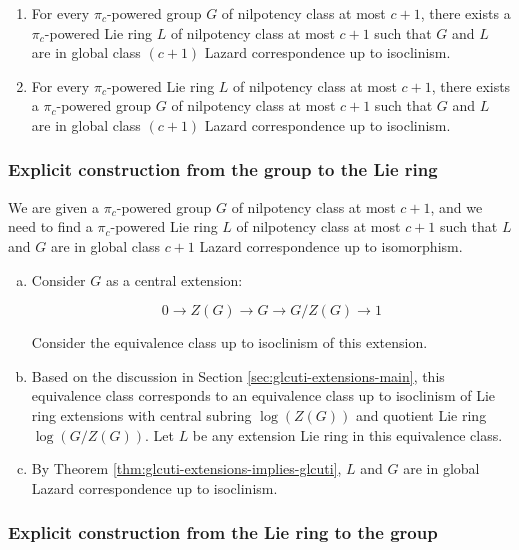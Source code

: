 \documentclass{ucetd}
\begin{document}
\begin{enumerate}
\item For every $\pi_c$-powered group $G$ of nilpotency class at most $c
  + 1$, there exists a $\pi_c$-powered Lie ring $L$ of nilpotency class at
  most $c + 1$ such that $G$ and $L$ are in global class $(c + 1)$ Lazard
  correspondence up to isoclinism.
\item For every $\pi_c$-powered Lie ring $L$ of nilpotency class at most
  $c + 1$, there exists a $\pi_c$-powered group $G$ of nilpotency class
  at most $c + 1$ such that $G$ and $L$ are in global class $(c + 1)$ Lazard
  correspondence up to isoclinism.
\end{enumerate}

\subsubsection{Explicit construction from the group to the Lie ring}

We are given a $\pi_c$-powered group $G$ of nilpotency class at most
$c + 1$, and we need to find a $\pi_c$-powered Lie ring $L$ of
nilpotency class at most $c + 1$ such that $L$ and $G$ are in global
class $c + 1$ Lazard correspondence up to isomorphism.

\begin{enumerate}[(a)]
\item Consider $G$ as a central extension:

  $$0 \to Z(G) \to G \to G/Z(G) \to 1$$

  Consider the equivalence class up to isoclinism of this extension.

\item Based on the discussion in Section
  \ref{sec:glcuti-extensions-main}, this equivalence class corresponds
  to an equivalence class up to isoclinism of Lie ring extensions with
  central subring $\log(Z(G))$ and quotient Lie ring
  $\log(G/Z(G))$. Let $L$ be any extension Lie ring in this
  equivalence class.

\item By Theorem \ref{thm:glcuti-extensions-implies-glcuti}, $L$ and $G$
  are in global Lazard correspondence up to isoclinism.
\end{enumerate}

\subsubsection{Explicit construction from the Lie ring to the group}
\end{document}
